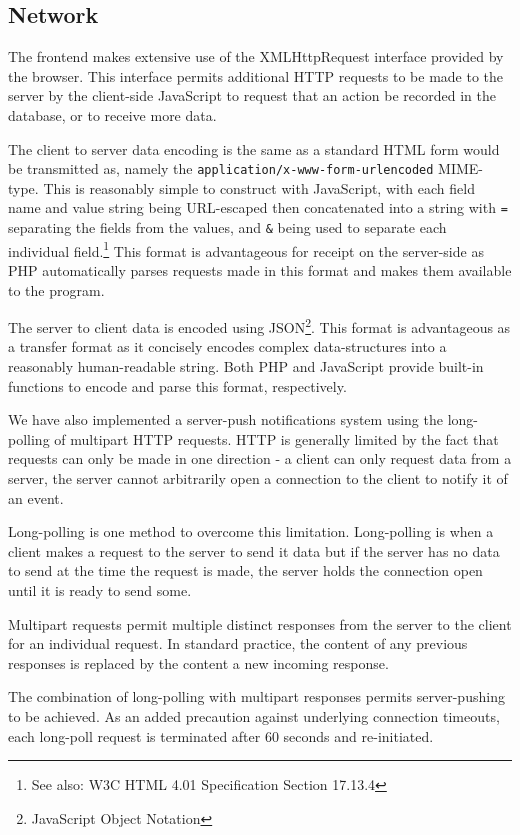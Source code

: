 \documentclass[12pt]{amsart}
\begin{document}
  \subsection{Network}
    \begin{flushleft}
      The frontend makes extensive use of the XMLHttpRequest interface provided 
      by the browser. This interface permits additional HTTP requests to be made 
      to the server by the client-side JavaScript to request that an action be 
      recorded in the database, or to receive more data.

      The client to server data encoding is the same as a standard HTML form 
      would be transmitted as, namely the 
      \verb|application/x-www-form-urlencoded| MIME-type. This is reasonably 
      simple to construct with JavaScript, with each field name and value
      string being URL-escaped then concatenated into a string with \verb|=| 
      separating the fields from the values, and \verb|&| being used to separate 
      each individual field.\footnote{See also: W3C HTML 4.01 Specification Section 
      17.13.4} This format is advantageous for receipt on the server-side as PHP 
      automatically parses requests made in this format and makes them available
      to the program.

      The server to client data is encoded using JSON\footnote{JavaScript Object 
      Notation}. This format is advantageous as a transfer format as it 
      concisely encodes complex data-structures into a reasonably human-readable 
      string. Both PHP and JavaScript provide built-in functions to encode and 
      parse this format, respectively.

      We have also implemented a server-push notifications system using the 
      long-polling of multipart HTTP requests. HTTP is generally limited by the 
      fact that requests can only be made in one direction - a client can only 
      request data from a server, the server cannot arbitrarily open a 
      connection to the client to notify it of an event.
      
      Long-polling is one 
      method to overcome this limitation. Long-polling is when a client makes a 
      request to the server to send it data but if the server has no data to 
      send at the time the request is made, the server holds the connection open 
      until it is ready to send some.
      
      Multipart requests permit multiple distinct responses from the server to 
      the client for an individual request. In standard practice, the content of 
      any previous responses is replaced by the content a new incoming response.

      The combination of long-polling with multipart responses permits 
      server-pushing to be achieved. As an added precaution against underlying 
      connection timeouts, each long-poll request is terminated after 60 seconds 
      and re-initiated.
    \end{flushleft}
\end{document}

